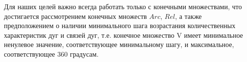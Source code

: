Для наших целей важно всегда работать только с конечными множествами, что достигается рассмотрением конечных множеств $Arc$, $Rel$, а также предположением о наличии минимального шага возрастания количественных характеристик дуг и связей дуг, т.е. конечное множество V имеет минимальное ненулевое значение, соответствующее минимальному шагу, и максимальное, соответствующее 360 градусам.
%
%
%
%
%
%
%
%
%
%
%
%
%
%
